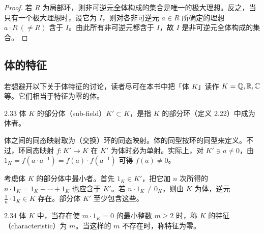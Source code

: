 \begin{proof}
若 $R$ 为局部环，则非可逆元全体构成的集合是唯一的极大理想。反之，当只有一个极大理想时，设它为 $I$，则对各非可逆元 $a\in R$ 所确定的理想 $a\cdot R\ (\neq R)$ 含于 $I$。由此所有非可逆元都含于 $I$，故 $I$ 是非可逆元全体构成的集合。
\end{proof}


\subsection{体的特征}

若想避开以下关于体特征的讨论，读者尽可在本书中把「体 $K$」读作 $K=\mathbb{Q},\mathbb{R},\mathbb{C}$ 等。它们相当于特征为零的体。

\begin{definition}{2.33} 体 $K$ 的部分体（sub-field）$K'\subset K$，是指 $K$ 的部分环（定义 2.22）中成为体者。\end{definition}

体之间的同态映射取为（交换）环的同态映射。体的同型按环的同型来定义。不过，环同态映射 $f\colon K'\to K$ 在 $K'$ 为体时必为单射。实际上，对 $K'\ni a\neq0$，由 $1_K=f(a\cdot a^{-1})=f(a)\cdot f(a^{-1})$ 可得 $f(a)\neq0$。


考虑体 $K$ 的部分体中最小者。首先 $1_K\in K'$，把它加 $n$ 次所得的 $n\cdot1_K=1_K+\cdots+1_K$ 也应含于 $K'$。若 $n\cdot1_K\neq0_K$，则由 $K$ 为体，逆元 $\frac{1}{n}\cdot1_K\in K$ 存在。部分体 $K'$ 至少包含这些。

\begin{definition}{2.34} 体 $K$ 中，当存在使 $m\cdot1_K=0$ 的最小整数 $m\ge2$ 时，称 $K$ 的特征（characteristic）为 $m$。当这样的 $m$ 不存在时，称特征为零。\end{definition}

